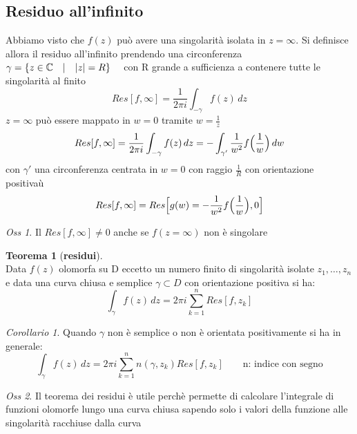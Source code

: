 \documentclass[a4paper,11pt]{report}
\theoremstyle{remark}
\newtheorem*{oss}{Oss}
\newtheorem*{coro}{Corollario}
\theoremstyle{definition}
\newtheorem*{teo}{Teorema}
\DeclarePairedDelimiter{\abs}{\lvert}{\rvert}
\begin{document}
\subsection{Residuo all'infinito}
	Abbiamo visto che $f(z)$ può avere una singolarità isolata in $ z=\infty$. Si definisce allora il residuo all'infinito prendendo una circonferenza $\gamma = \{z \in \mathbb{C} \quad \vert \quad \abs{z}=R \} \quad$ con R grande a sufficienza a contenere tutte le singolarità al finito
	\begin{equation*}
		Res[f,\infty] = \frac{1}{2 \pi i } \int_{-\gamma} f(z)\,dz  
	\end{equation*} 
	$z=\infty$ può essere mappato in $w=0$ tramite $ w = \frac{1}{z}$
	\begin{equation*}
		Res[f,\infty] = \frac{1}{2 \pi i } \int_{-\gamma} f(z)\,dz = -\int_{\gamma'} \frac{1}{w^2}f\Bigl(\frac{1}{w}\Bigr)\,dw 
	\end{equation*} 
	con $\gamma'$ una circonferenza centrata in $w=0$ con raggio $\frac{1}{R}$ con orientazione positivaù
	\begin{equation*}
		Res[f,\infty] = 	Res\Bigl[g(w) = -\frac{1}{w^2} f\Bigl(\frac{1}{w}\Bigr),0\Bigr]
	\end{equation*}

	\begin{oss}
		Il $Res[f,\infty] \neq 0$ anche se $f(z=\infty)$ non è singolare
	\end{oss}

	\begin{teo}[\textbf{residui}]\hfil\\
		Data $f(z)$ olomorfa su D eccetto un numero finito di singolarità isolate $z_1,\dots,z_n$ e data una curva chiusa e semplice $\gamma \subset D$ con orientazione positiva si ha: 
		\begin{equation}
			\int_\gamma f(z)\,dz = 2 \pi i \sum_{k=1}^{n}Res[f,z_k] 
		\end{equation}
	\end{teo}

	\begin{coro}
		Quando $\gamma$ non è semplice o non è orientata positivamente si ha in generale:
		\begin{equation*}
			\int_\gamma f(z)\,dz = 2 \pi i \sum_{k=1}^{n} n(\gamma, z_k)Res[f,z_k] \qquad \textrm{n: indice con segno}
		\end{equation*}
	\end{coro}

	\begin{oss}
		Il teorema dei residui è utile perchè permette di calcolare l'integrale di funzioni olomorfe lungo una curva chiusa sapendo solo i valori della funzione alle singolarità racchiuse dalla curva
	\end{oss}
\end{document}
